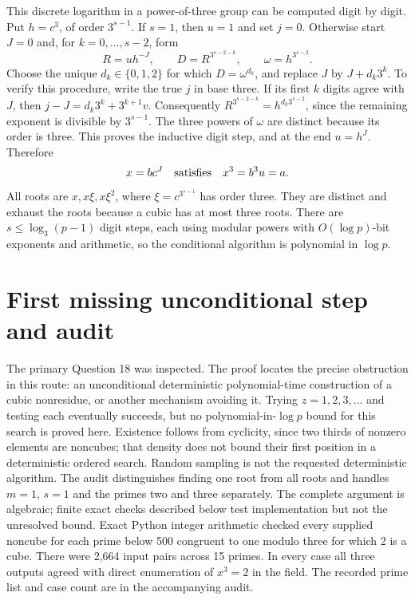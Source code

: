 \documentclass[11pt]{article}
\begin{document}
This discrete logarithm in a power-of-three group can be computed
digit by digit. Put $h=c^3$, of order $3^{s-1}$. If $s=1$,
then $u=1$ and set $j=0$. Otherwise start $J=0$ and, for
$k=0,\ldots,s-2$, form
\[
R=u h^{-J},\qquad D=R^{3^{s-2-k}},\qquad
\omega=h^{3^{s-2}}.
\]
Choose the unique $d_k\in\{0,1,2\}$ for which $D=\omega^{d_k}$,
and replace $J$ by $J+d_k3^k$. To verify this procedure, write
the true $j$ in base three. If its first $k$ digits agree with
$J$, then $j-J=d_k3^k+3^{k+1}v$. Consequently
$R^{3^{s-2-k}}=h^{d_k3^{s-2}}$, since the remaining exponent
is divisible by $3^{s-1}$. The three powers of $\omega$ are
distinct because its order is three. This proves the inductive
digit step, and at the end $u=h^J$. Therefore
\[
x=b c^J\quad\hbox{satisfies}\quad x^3=b^3u=a.
\]
All roots are $x,x\xi,x\xi^2$, where
$\xi=c^{3^{s-1}}$ has order three. They are distinct and exhaust
the roots because a cubic has at most three roots. There are
$s\le\log_3(p-1)$ digit steps, each using modular powers with
$O(\log p)$-bit exponents and arithmetic, so the conditional
algorithm is polynomial in $\log p$.

\section{First missing unconditional step and audit}
The primary Question 18 was inspected. The proof locates the precise
obstruction in this route: an unconditional deterministic polynomial-time
construction of a cubic nonresidue, or another mechanism avoiding it.
Trying $z=1,2,3,\ldots$ and testing each eventually succeeds, but no
polynomial-in-$\log p$ bound for this search is proved here.
Existence follows from cyclicity, since two thirds of nonzero elements
are noncubes; that density does not bound their first position in a
deterministic ordered search. Random sampling is not the requested
deterministic algorithm. The audit distinguishes finding one root
from all roots and handles $m=1$, $s=1$ and the primes two and
three separately. The complete argument is algebraic; finite exact
checks described below test implementation but not the unresolved bound.
Exact Python integer arithmetic checked every supplied noncube for each
prime below 500 congruent to one modulo three for which 2 is a cube.
There were 2,664 input pairs across 15 primes. In every case all three
outputs agreed with direct enumeration of $x^3=2$ in the field.
The recorded prime list and case count are in the accompanying audit.
\end{document}
